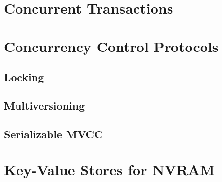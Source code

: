 \section{Concurrent Transactions}

\section{Concurrency Control Protocols}

\subsection{Locking}

\subsection{Multiversioning}

\subsection{Serializable MVCC}

\section{Key-Value Stores for NVRAM}

